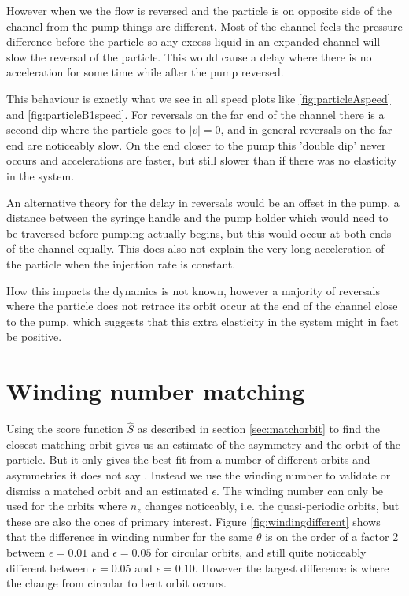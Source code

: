 However when we the flow is reversed and the particle is on opposite side of the channel from the pump things are different. Most of the channel feels the pressure difference before the particle so any excess liquid in an expanded channel will slow the reversal of the particle. This would cause a delay where there is no acceleration for some time while after the pump reversed. 

This behaviour is exactly what we see in all speed plots like \ref{fig:particleAspeed} and \ref{fig:particleB1speed}. 
For reversals on the far end of the channel there is a second dip where the particle goes to $\left|v\right|=0$, and in general reversals on the far end are noticeably slow. On the end closer to the pump this 'double dip' never occurs and accelerations are faster, but still slower than if there was no elasticity in the system.

An alternative theory for the delay in reversals would be an offset in the pump, a distance between the syringe handle and the pump holder which would need to be traversed before pumping actually begins, but this would occur at both ends of the channel equally. This does also not explain the very long acceleration of the particle when the injection rate is constant.

How this impacts the dynamics is not known, however a majority of reversals where the particle does not retrace its orbit occur at the end of the channel close to the pump, which suggests that this extra elasticity in the system might in fact be positive. 

\section{Winding number matching}
Using the score function $\hat{S}$ as described in section \ref{sec:matchorbit} to find the closest matching orbit gives us an estimate of the asymmetry and the orbit of the particle. But it only gives the best fit from a number of different orbits and asymmetries it does not say .  Instead we use the winding number to validate or dismiss a matched orbit and an estimated $\epsilon$. The winding number can only be used for the orbits where $n_z$ changes noticeably, i.e. the quasi-periodic orbits, but these are also the ones of primary interest. 
Figure \ref{fig:windingdifferent} shows that the difference in winding number for the 
same $\theta$ is on the order of a factor 2 between $\epsilon = 0.01$ and $\epsilon = 0.05$ for circular orbits, and 
still quite noticeably different between $\epsilon = 0.05$ and $\epsilon = 0.10$. However the largest difference is where the change from 
circular to bent orbit occurs. 

